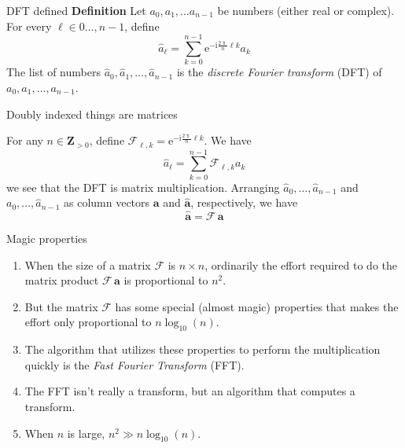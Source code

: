 \documentclass[portrait,fleqn,12pt]{beamer}
\newcommand{\integers}{\mathbf{Z}}
\newcommand{\euler}{\mathrm{e}}
\newcommand{\imag}{\mathrm{i}}
\newenvironment{handlist}
   {\begin{enumerate}[\faHandPointRight]
       \addtolength{\itemsep}{0.0\itemsep}}
     {\end{enumerate}}
\newenvironment{define}[1]{
  \textbf{Definition} #1}{}
\begin{document}
  \begin{frame}{DFT defined}
  \begin{define}  Let $a_0, a_1, \dots a_{n-1}$ be numbers (either real or complex).   For every $\ell \in 0 \dots, n-1$, define
  \begin{equation*}
      \widehat a_\ell = \sum_{k=0}^{n-1}  \euler^{-  \imag \frac{2 \uppi}{n}  \ell  k} a_k
  \end{equation*}
  The list of numbers  $\widehat a_0,  \widehat a_1, \dots, \widehat a_{n-1}$ is the \emph{discrete Fourier transform} (DFT) of 
  $a_0, a_1, \dots, a_{n-1}$.
  
  \end{define}
  \end{frame}
  
  \begin{frame}{Doubly indexed things are matrices}
 
 For any $n \in \integers_{>0}$, define $\mathcal{F}_{\ell, k}  = \euler^{-  \imag \frac{2 \uppi}{n}  \ell  k}$. We  have
   \begin{equation*}
      \widehat a_\ell = \sum_{k=0}^{n-1}  \mathcal{F}_{\ell, k} a_k
  \end{equation*}
  we see that the DFT is matrix multiplication. Arranging $\widehat a_0, \dots, \widehat a_{n-1}$ and  
   $a_0, \dots, \widehat a_{n-1}$ as column vectors $\mathbf{a}$ and  $\widehat{\mathbf{a}}$,  respectively, we have
    \begin{equation*}
      \widehat{\mathbf{a}}  = \mathcal{F} \, \mathbf{a}
  \end{equation*}
  
    \end{frame}
    
     \begin{frame}{Magic properties}
     
     \begin{handlist}
     \item When the size of a matrix $\mathcal{F}$ is $n\times n$, ordinarily  the effort required to do the matrix product $ \mathcal{F} \, \mathbf{a}$ is proportional to $n^2$.  
     
     \item But the matrix $\mathcal{F}$ has some special (almost magic) properties that 
     makes the effort only proportional to 
     $n \log_{10}( n)$.
     
     \item The algorithm that utilizes these properties to perform the multiplication quickly is the \emph{Fast Fourier Transform} (FFT).
     
     \item The FFT isn't really a transform, but an algorithm that computes a transform.
     
     \item When $n$ is large, $n^2 \gg n \log_{10}(n)$.
 
 \end{handlist}
  
    \end{frame}
    
\end{document}
